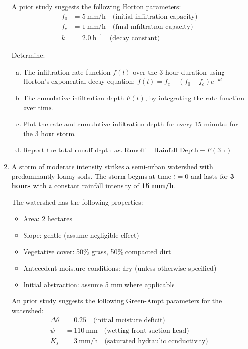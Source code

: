 \documentclass[12pt]{article}
\begin{document}
\begin{enumerate}
A prior study suggests the following Horton parameters:
\begin{align*}
    f_0 &= 5\ \text{mm/h} \quad \text{(initial infiltration capacity)} \\
    f_c &= 1\ \text{mm/h} \quad \text{(final infiltration capacity)} \\
    k   &= 2.0\ \text{h}^{-1} \quad \text{(decay constant)}
\end{align*}


Determine:
\begin{enumerate}[a)]
    \item The infiltration rate function $f(t)$ over the 3-hour duration using Horton’s exponential decay equation: $f(t) = f_c + (f_0 - f_c) e^{-kt}$
    \item The cumulative infiltration depth $F(t)$, by integrating the rate function over time.
    \item Plot the rate and cumulative infiltration depth for every 15-minutes for the 3 hour storm.
    \item Report the total runoff depth as: $\text{Runoff} = \text{Rainfall Depth} - F(3\ \text{h})$
\end{enumerate}
\clearpage
\item A storm of moderate intensity strikes a semi-urban watershed with predominantly loamy soils. The storm begins at time $ t = 0 $ and lasts for \textbf{3 hours} with a constant rainfall intensity of \textbf{15 mm/h}.

The watershed has the following properties:

\begin{itemize}
    \item Area: 2 hectares
    \item Slope: gentle (assume negligible effect)
    \item Vegetative cover: 50\% grass, 50\% compacted dirt
    \item Antecedent moisture conditions: dry (unless otherwise specified)
    \item Initial abstraction: assume 5 mm where applicable
\end{itemize}

An prior study suggests the following Green-Ampt parameters for the watershed:
\begin{align*}
    \Delta \theta &= 0.25 \quad \text{(initial moisture deficit)} \\
    \psi &= 110\ \text{mm} \quad \text{(wetting front suction head)} \\
    K_s &= 3\ \text{mm/h} \quad \text{(saturated hydraulic conductivity)}
\end{align*}


\end{enumerate}
\end{document}
